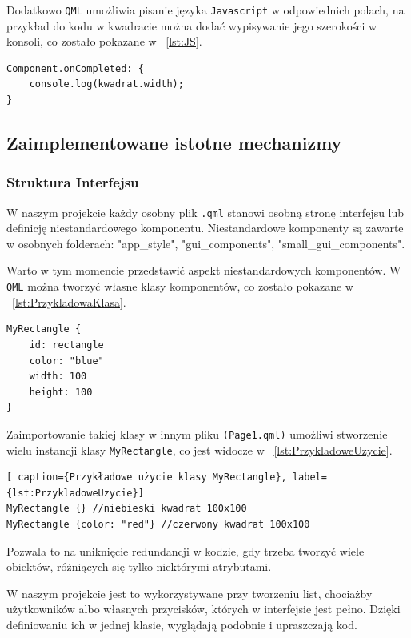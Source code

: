 Dodatkowo \texttt{QML} umożliwia pisanie języka \texttt{Javascript} w odpowiednich polach,
na przykład do kodu w kwadracie można dodać wypisywanie jego szerokości w konsoli, co zostało pokazane w \lstlistingname{~\ref{lst:JS}}.

\begin{lstlisting}[caption={Przykładowy Javascript}, label={lst:JS}]
Component.onCompleted: {
    console.log(kwadrat.width);
}
\end{lstlisting}

\subsection{Zaimplementowane istotne mechanizmy}
\label{sec:ZaimplementowaneIstotneMechanizmy}

\subsubsection{Struktura Interfejsu}
\label{sec:Struktura Interfejsu}
W naszym projekcie każdy osobny plik \texttt{.qml} stanowi osobną stronę interfejsu lub
definicję niestandardowego komponentu. Niestandardowe komponenty są zawarte
w osobnych folderach: "app\_style", "gui\_components", "small\_gui\_components".

Warto w tym momencie przedstawić aspekt niestandardowych komponentów. W \texttt{QML} można tworzyć własne klasy komponentów, co zostało pokazane w \lstlistingname{~\ref{lst:PrzykladowaKlasa}}.

\begin{lstlisting}[caption={Przykładowa klasa w MyRectangle.qml}, label={lst:PrzykladowaKlasa}]
MyRectangle {
    id: rectangle
    color: "blue"
    width: 100
    height: 100
}
\end{lstlisting}
Zaimportowanie takiej klasy w innym pliku \texttt{(Page1.qml)} umożliwi stworzenie
wielu instancji klasy \texttt{MyRectangle}, co jest widocze w \lstlistingname{~\ref{lst:PrzykladoweUzycie}}.

\begin{lstlisting}[ caption={Przykładowe użycie klasy MyRectangle}, label={lst:PrzykladoweUzycie}]
MyRectangle {} //niebieski kwadrat 100x100
MyRectangle {color: "red"} //czerwony kwadrat 100x100
\end{lstlisting}
Pozwala to na uniknięcie redundancji w kodzie, gdy trzeba tworzyć
wiele obiektów, różniących się tylko niektórymi atrybutami.

W naszym projekcie jest to wykorzystywane przy tworzeniu list, chociażby
użytkowników albo własnych przycisków, których w interfejsie jest pełno. Dzięki definiowaniu ich w jednej klasie, wyglądają podobnie i upraszczają kod.

